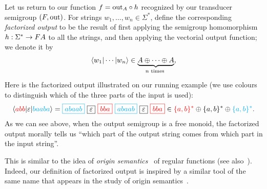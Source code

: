 
Let us return to our function $f = \mathrm{out}_A \circ h$ recognized by our transducer semigroup $(\functor,\outfun)$.
For strings $w_1,\ldots,w_n \in \Sigma^*$, define the corresponding \emph{factorized output} to be the result of first applying the semigroup homomorphism $h : \Sigma^* \to \functor A$ to all the strings, and then applying the vectorial output function; we denote it by 
\begin{align*}
\tuple{w_1| \cdots | w_n} \in \myunderbrace{A \oplus \cdots \oplus A}{$n$ times},
\end{align*}
Here is the factorized output illustrated on our running example (we use colours to distinguish which of the three parts of the input is used):
\begin{align*}
  \tuple{\red{abb} | \varepsilon | \blue{baaba}} =  
  \blue{\boxed{abaab}} \ 
  \boxed{\varepsilon} \ 
  \red{\boxed{bba}} \ 
  \blue{\boxed{abaab}} \
  \boxed{\varepsilon} \
  \red{\boxed{bba}}
  \in \red{\set{a,b}^*} \oplus \set{a,b}^*  \oplus \blue{\set{a,b}^*}.
\end{align*}
As we can see above, when the output semigroup is a free monoid, the factorized output morally tells us \enquote{which part of the output string comes from which part in the input string}.
\begin{remark}
This is similar to the idea of \emph{origin semantics}~\cite{bojanczykTransducersOriginInformation2014} of regular functions (see also~\cite[Section~5]{MuschollPuppis}). Indeed, our definition of factorized output is inspired by a similar tool of the same name that appears in the study of origin semantics~\cite[Section~2]{bojanczykTransducersOriginInformation2014}.
\end{remark}

